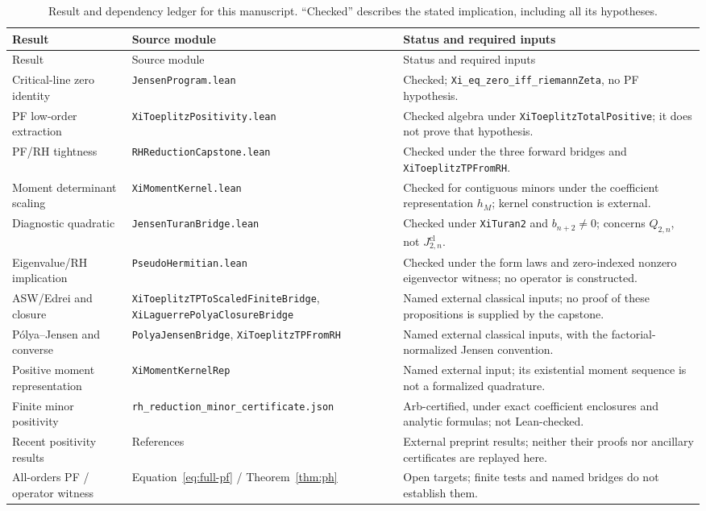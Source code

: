 \documentclass[11pt]{article}
\newcommand{\code}[1]{\ifmmode\text{\nolinkurl{#1}}\else\nolinkurl{#1}\fi}
\theoremstyle{plain}
\theoremstyle{definition}
\theoremstyle{remark}
\begin{document}
\begingroup\small
\begin{longtable}{@{}>{\raggedright\arraybackslash}p{.22\linewidth}
>{\raggedright\arraybackslash}p{.32\linewidth}
>{\raggedright\arraybackslash}p{.39\linewidth}@{}}
\caption{Result and dependency ledger for this manuscript. ``Checked'' describes
the stated implication, including all its hypotheses.}\label{tab:ledger}\\
\toprule Result & Source module & Status and required inputs\\\midrule
\endfirsthead
\toprule Result & Source module & Status and required inputs\\\midrule
\endhead
Critical-line zero identity & \code{JensenProgram.lean} & Checked;
\code{Xi_eq_zero_iff_riemannZeta}, no PF hypothesis.\\
PF low-order extraction & \code{XiToeplitzPositivity.lean} & Checked algebra
under \code{XiToeplitzTotalPositive}; it does not prove that hypothesis.\\
PF/RH tightness & \code{RHReductionCapstone.lean} & Checked under the three
forward bridges and \code{XiToeplitzTPFromRH}.\\
Moment determinant scaling & \code{XiMomentKernel.lean} & Checked for
contiguous minors under the coefficient representation $h_M$; kernel
construction is external.\\
Diagnostic quadratic & \code{JensenTuranBridge.lean} & Checked under
\code{XiTuran2} and $b_{n+2}\ne0$; concerns $Q_{2,n}$, not
$J^{\mathrm{cl}}_{2,n}$.\\
Eigenvalue/RH implication & \code{PseudoHermitian.lean} & Checked under the
form laws and zero-indexed nonzero eigenvector witness; no operator is
constructed.\\
ASW/Edrei and closure & \code{XiToeplitzTPTo}\allowbreak\code{ScaledFiniteBridge},
\code{XiLaguerrePolyaClosureBridge} & Named external classical inputs;
no proof of these propositions is supplied by the capstone.\\
Pólya--Jensen and converse & \code{PolyaJensenBridge},
\code{XiToeplitzTPFromRH} & Named external classical inputs, with the
factorial-normalized Jensen convention.\\
Positive moment representation & \code{XiMomentKernelRep} & Named external
input; its existential moment sequence is not a formalized quadrature.\\
Finite minor positivity & \code{rh_reduction_minor_certificate.json} &
Arb-certified, under exact coefficient enclosures and analytic formulas;
not Lean-checked.\\
Recent positivity results & References~\cite{Michalowski2026wedge,Michalowski2026pf5,LiuMao2026}
& External preprint results; neither their proofs nor ancillary certificates
are replayed here.\\
All-orders PF / operator witness & Equation~\eqref{eq:full-pf} /
Theorem~\ref{thm:ph} & Open targets; finite tests and named bridges do not
establish them.\\\bottomrule
\end{longtable}
\endgroup
\end{document}
